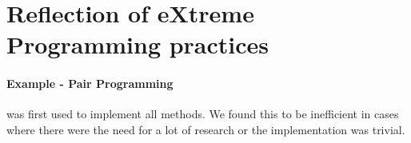 \section{Reflection of eXtreme Programming practices}

\paragraph{Example - Pair Programming} was first used to implement all methods. We found this to be inefficient in cases where there were the need for a lot of research or the implementation was trivial.